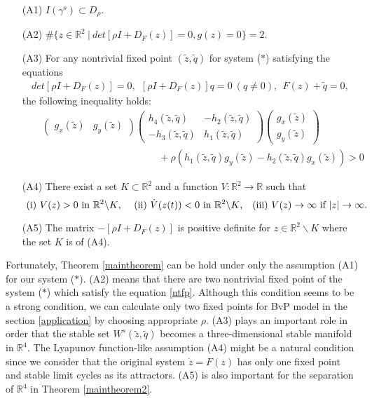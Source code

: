 \documentclass[11pt,reqno]{amsart}
\begin{document}
\begin{itemize}
\item[(A1)] $I(\gamma^s)\subset D_\rho$.
\item[(A2)] $\#\{z\in\mathbb{R}^2\ |\ det[\rho I+D_F(z)]=0, g(z)=0\}=2$.
\item[(A3)] For any nontrivial fixed point $(\tilde{z},\tilde{q})$ for system ($\ast$) satisfying the equations 
\begin{eqnarray}\label{ntfp}
det[\rho I+D_F(z)]=0,\ \  [\rho I+D_F(z)]q=0\ (q\neq 0),\ \  F(z)+\tilde{q}=0,
\end{eqnarray}
the following inequality holds:
\begin{eqnarray}
&&\begin{pmatrix}
g_x(\tilde{z}) & g_y(\tilde{z})
\end{pmatrix}
\begin{pmatrix}
h_4(\tilde{z},\tilde{q}) & -h_2(\tilde{z},\tilde{q}) \\
-h_3(\tilde{z},\tilde{q}) & h_1(\tilde{z},\tilde{q})
\end{pmatrix}
\begin{pmatrix}
g_x(\tilde{z})\\ 
g_y(\tilde{z})
\end{pmatrix}\nonumber\\
&&\hspace{5cm}+\rho(h_1(\tilde{z},\tilde{q})g_y(\tilde{z})-h_2(\tilde{z},\tilde{q})g_x(\tilde{z}))>0\nonumber
\end{eqnarray}
\item[(A4)] There exist a set $K\subset\mathbb{R}^2$ and a function $V:\mathbb{R}^2\to\mathbb{R}$ such that
$$\text{
 (i) $V(z)>0$ in $\mathbb{R}^2\backslash K$, \quad
 (ii) $\dot{V}(z(t))<0$ in $\mathbb{R}^2\backslash K$,\quad
 (iii) $V(z)\to\infty$ if $|z|\to\infty$.
}$$
\item[(A5)] The matrix $-[\rho I+D_F(z)]$ is positive definite for $z\in\mathbb{R}^2\backslash K$ where the set $K$ is of (A4).
\end{itemize}
%
Fortunately, Theorem \ref{maintheorem} can be hold under only the assumption (A1) for our system ($\ast$). 
(A2) means that there are two nontrivial fixed point of the system ($\ast$) which satisfy the equation \eqref{ntfp}. Although this condition seems to be a strong condition, we can calculate only two fixed points for BvP model in the section \ref{application} by choosing appropriate $\rho$. (A3) plays an important role in order that the stable set $W^s(\tilde{z},\tilde{q})$ becomes a three-dimensional stable manifold in $\mathbb{R}^4$. The Lyapunov function-like assumption (A4) might be a natural condition since we consider that the original system $\dot{z}=F(z)$ has only one fixed point and stable limit cycles as its attractors. (A5) is also important for the separation of $\mathbb{R}^4$ in Theorem \ref{maintheorem2}.
\end{document}
